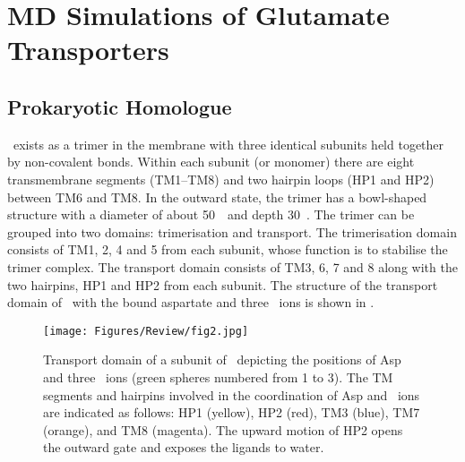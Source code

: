\section{MD Simulations of Glutamate Transporters}
\subsection{Prokaryotic Homologue \GltPh}
\GltPh\ exists as a trimer in the membrane with three identical subunits held 
together by non-covalent bonds. Within each subunit (or monomer) there are eight 
transmembrane segments (TM1--TM8) and two hairpin loops (HP1 and HP2) between 
TM6 and TM8. In the outward state, the trimer has a bowl-shaped structure with 
a diameter of about 50~\angs\ and depth 30~\angs. The trimer can be grouped into 
two domains: trimerisation and transport. The trimerisation domain consists of 
TM1, 2, 4 and 5 from each subunit, whose function is to stabilise the trimer 
complex. The transport domain consists of TM3, 6, 7 and 8 along with the two 
hairpins, HP1 and HP2 from each subunit. The structure of the transport domain 
of \GltPh\ with the bound aspartate and three \Na\ ions is shown in 
.

\begin{figure}[t!]
\centering
\texttt{[image: Figures/Review/fig2.jpg]}
\caption{Transport domain of a subunit of \GltPh\ depicting the 
positions of Asp and three \Na\ ions (green spheres numbered from 1 to 3). The 
TM segments and hairpins involved in the coordination of Asp and \Na\ ions 
are indicated as follows: HP1 (yellow), HP2 (red), TM3 (blue), TM7 (orange), 
and TM8 (magenta). The upward motion of HP2 opens the outward gate and exposes the 
ligands to water.}
\label{review:fig2}
\end{figure}

